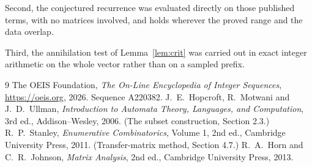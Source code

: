 \documentclass[11pt,a4paper]{article}
\theoremstyle{plain}
\theoremstyle{definition}
\begin{document}
Second, the conjectured recurrence was evaluated directly on those published terms, with no
matrices involved, and holds wherever the proved range and the data overlap.

Third, the annihilation test of Lemma~\ref{lem:crit} was carried out in exact integer
arithmetic on the whole vector rather than on a sampled prefix.

\begin{thebibliography}{9}
 The OEIS Foundation, \emph{The On-Line Encyclopedia of Integer
Sequences}, \url{https://oeis.org}, 2026. Sequence A220382.
 J.~E.~Hopcroft, R.~Motwani and J.~D.~Ullman, \emph{Introduction to Automata
Theory, Languages, and Computation}, 3rd ed., Addison--Wesley, 2006. (The subset
construction, Section 2.3.)
 R.~P.~Stanley, \emph{Enumerative Combinatorics}, Volume 1, 2nd ed.,
Cambridge University Press, 2011. (Transfer-matrix method, Section 4.7.)
 R.~A.~Horn and C.~R.~Johnson, \emph{Matrix Analysis}, 2nd ed., Cambridge
University Press, 2013.
\end{thebibliography}
\end{document}
